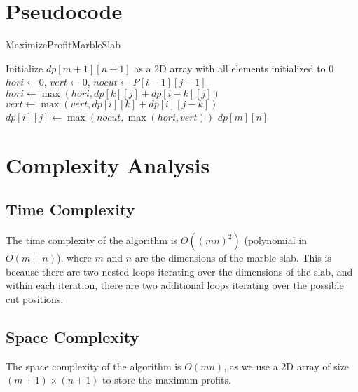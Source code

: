 \documentclass{article}
\begin{document}
\section{Pseudocode}
    \begin{algorithm}
    \caption{MaximizeProfitMarbleSlab}
    \begin{algorithmic}[1]
    
     
        \State Initialize $dp[m+1][n+1]$ as a 2D array with all elements initialized to $0$
          
              
                \State $hori \gets 0$, $vert \gets 0$, $nocut \gets P[i-1][j-1]$  
                  
                    \State $hori \gets \max(hori, dp[k][j] + dp[i-k][j])$  
                \EndFor
                  
                    \State $vert \gets \max(vert, dp[i][k] + dp[i][j-k])$  
                \EndFor
                \State $dp[i][j] \gets \max(nocut, \max(hori, vert))$  
            \EndFor
        \EndFor
        \State \Return $dp[m][n]$  
    \EndFunction

\end{algorithmic}
\end{algorithm}


\section{Complexity Analysis}
    \subsection{Time Complexity}
    The time complexity of the algorithm is $O((mn)^2)$ (polynomial in $O(m+n)$), where $m$ and $n$ are the dimensions of the marble slab. This is because there are two nested loops iterating over the dimensions of the slab, and within each iteration, there are two additional loops iterating over the possible cut positions.
    
    \subsection{Space Complexity}
    The space complexity of the algorithm is $O(mn)$, as we use a 2D array of size $(m+1) \times (n+1)$ to store the maximum profits.
\end{document}
